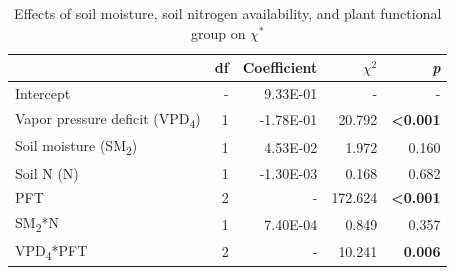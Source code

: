 \newpage
\begin{table}
    \centering
    \caption{Effects of soil moisture, soil nitrogen availability, and plant functional group on $\chi^*$}
        \begin{tabular}{p{6cm}p{0.5cm}p{2cm}p{1.5cm}p{1.5cm}}
            \hline 
            & \multicolumn{1}{r}{df} 
            & \multicolumn{1}{r}{Coefficient} 
            & \multicolumn{1}{r}{$\chi^{2}$} 
            & \multicolumn{1}{r}{\textit{p}} 
            \\ 
            \hline
            
            Intercept
            & \multicolumn{1}{r}{-}
            & \multicolumn{1}{r}{9.33E-01}
            & \multicolumn{1}{r}{-}
            & \multicolumn{1}{r}{-}
            \\

            Vapor pressure deficit (VPD\textsubscript{4})
            & \multicolumn{1}{r}{1}
            & \multicolumn{1}{r}{-1.78E-01}
            & \multicolumn{1}{r}{20.792}
            & \multicolumn{1}{r}{\textbf{<0.001}}
            \\

            Soil moisture (SM\textsubscript{2})
            & \multicolumn{1}{r}{1}
            & \multicolumn{1}{r}{4.53E-02}
            & \multicolumn{1}{r}{1.972}
            & \multicolumn{1}{r}{0.160}
            \\

            Soil N (N)
            & \multicolumn{1}{r}{1}
            & \multicolumn{1}{r}{-1.30E-03}
            & \multicolumn{1}{r}{0.168}
            & \multicolumn{1}{r}{0.682}
            \\

            PFT
            & \multicolumn{1}{r}{2}
            & \multicolumn{1}{r}{-}
            & \multicolumn{1}{r}{172.624}
            & \multicolumn{1}{r}{\textbf{<0.001}}
            \\

            SM\textsubscript{2}*N
            & \multicolumn{1}{r}{1}
            & \multicolumn{1}{r}{7.40E-04}
            & \multicolumn{1}{r}{0.849}
            & \multicolumn{1}{r}{0.357}
            \\

            VPD\textsubscript{4}*PFT
            & \multicolumn{1}{r}{2}
            & \multicolumn{1}{r}{-}
            & \multicolumn{1}{r}{10.241}
            & \multicolumn{1}{r}{\textbf{0.006}}
            \\


\end{tabular}
\end{table}
